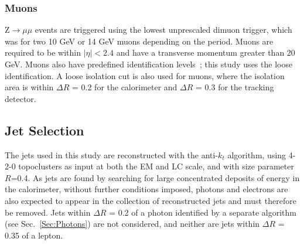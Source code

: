 
\subsubsection{Muons}
Z$\rightarrow\mu\mu$ events are triggered using the lowest unprescaled dimuon trigger, which was for two 10 GeV or 14 GeV muons depending on the period.   
Muons are required to be within ${\mid\eta\mid<2.4}$ and have a transverse momentum greater than 20 GeV.  
Muons also have predefined identification levels~\cite{ATL-PHYS-PUB-2015-037}; this study uses the loose identification.  
A loose isolation cut is also used for muons, where the isolation area is within $\Delta R$ = 0.2 for the calorimeter and $\Delta R$ = 0.3 for the tracking detector.  

\subsection{Jet Selection}
The jets used in this study are reconstructed with the anti-$k_t$ algorithm, using 4-2-0 topoclusters as input at both the EM and LC scale, and with size parameter $R$=0.4.  
As jets are found by searching for large concentrated deposits of energy in the calorimeter, without further conditions imposed, photons and electrons are also expected to appear in the collection of reconstructed jets and must therefore be removed.  
Jets within $\Delta R$ = 0.2 of a photon identified by a separate algorithm (see Sec.~\ref{Sec:Photons}) are not considered, and neither are jets within $\Delta R$ = 0.35 of a lepton.  

